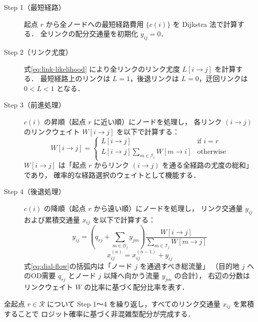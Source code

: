 \begin{description}
  \item[\textsf{Step 1}（最短経路）]
    起点 $r$ から全ノードへの最短経路費用 $\{c(i)\}$ を Dijkstra 法で計算する．
    全リンクの配分交通量を初期化 $y_{ij} = 0$．

  \item[\textsf{Step 2}（リンク尤度）]
    式\eqref{eq:link-likelihood} により全リンクのリンク尤度 $L[i \to j]$ を計算する．
    最短経路上のリンクは $L=1$，後退リンクは $L=0$，迂回リンクは $0 < L < 1$ となる．

  \item[\textsf{Step 3}（前進処理）]
    $c(i)$ の昇順（起点 $r$ に近い順）にノードを処理し，
    各リンク $(i \to j)$ のリンクウェイト $W[i \to j]$ を以下で計算する：
    \begin{equation}
      W[i \to j] =
      \begin{cases}
        L[i \to j] & \text{if } i = r \\[4pt]
        L[i \to j] \displaystyle\sum_{m \in \mathcal{I}_i} W[m \to i] & \text{otherwise}
      \end{cases}
      \label{eq:dial-weight}
    \end{equation}
    $W[i \to j]$ は「起点 $r$ からリンク $(i \to j)$ を通る全経路の尤度の総和」であり，
    確率的な経路選択のウェイトとして機能する．

  \item[\textsf{Step 4}（後退処理）]
    $c(i)$ の降順（起点 $r$ から遠い順）にノードを処理し，
    リンク交通量 $y_{ij}$ および累積交通量 $x_{ij}$ を以下で計算する：
    \begin{equation}
      y_{ij} = \left(q_{rj} + \sum_{m \in \mathcal{O}_j} y_{jm}\right)
                \frac{W[i \to j]}{\displaystyle\sum_{m \in \mathcal{I}_j} W[m \to j]}
      \label{eq:dial-flow}
    \end{equation}
    \begin{equation}
      x_{ij}^{(n)} = x_{ij}^{(n-1)} + y_{ij}
      \label{eq:dial-cumflow}
    \end{equation}
    式\eqref{eq:dial-flow}の括弧内は「ノード $j$ を通過すべき総流量」
    （目的地 $j$ へのOD需要 $q_{rj}$ とノード $j$ 以降へ向かう流量 $y_{jm}$ の合計），
    右辺の分数はリンクウェイト $W$ の比率に基づく配分比率を表す．
\end{description}

全起点 $r \in \mathcal{R}$ について Step 1〜4 を繰り返し，すべてのリンク交通量 $x_{ij}$ を累積することで
ロジット確率に基づく非混雑型配分が完成する．

